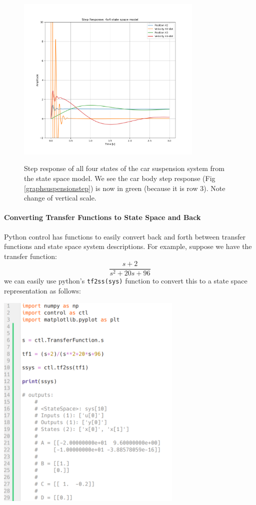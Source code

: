 \begin{figure}\centering\label{graph4steps}
    \includegraphics[width=3.5in]{figs04/all4StepResponsesCarBody.png}
    \caption{Step response of all four states of the car suspension system from the state space model. We see the car body step response (Fig \ref{graphsuspensionstep}) is now in
    green (because it is row 3).  Note change of vertical scale. }
\end{figure}

\paragraph{Converting Transfer Functions to State Space and Back}
Python control has functions to easily convert back and forth between transfer functions and state space system descriptions.   For example, suppose we have the transfer function:
\[
\frac{s+2}{s^2+20s+96}
\]
we can easily use python's {\tt tf2ss(sys)} function
to convert this to a state space representation as follows:

\begin{center}
\includegraphics[width=3.5in]{figs04/Y13M75.png}
\end{center}

